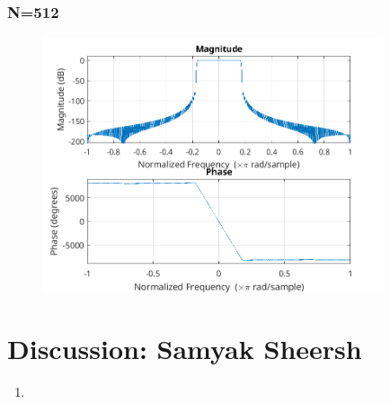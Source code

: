 \documentclass{article}
\begin{document}
  \subsubsection{N=512}
  \begin{figure}[!htb]
  \includegraphics[width=10cm]{freqz_bl_512.png}
  \end{figure}

\section{Discussion: Samyak Sheersh}
\begin{enumerate}
  \item
\end{enumerate}
\end{document}

